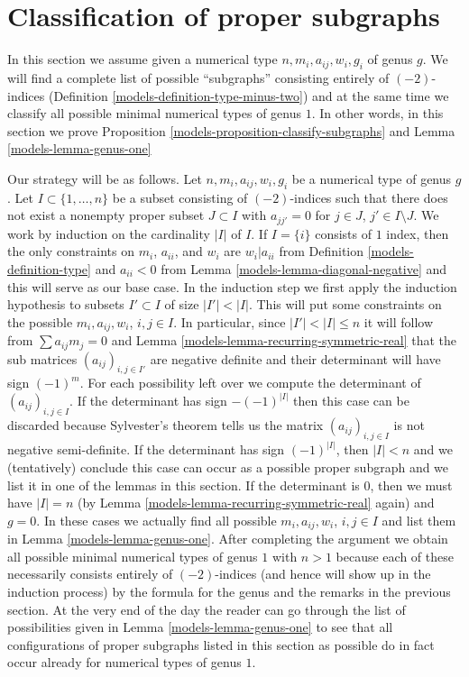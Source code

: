 \section{Classification of proper subgraphs}
\label{models-section-classify-proper-subgraphs}
In this section we assume given a numerical type
$n, m_i, a_{ij}, w_i, g_i$ of genus $g$. We will find
a complete list of possible ``subgraphs'' consisting entirely
of $(-2)$-indices (Definition \ref{models-definition-type-minus-two}) and
at the same time we classify all possible minimal numerical
types of genus $1$. In other words, in this section we prove
Proposition \ref{models-proposition-classify-subgraphs} and
Lemma \ref{models-lemma-genus-one}

\medskip\noindent
Our strategy will be as follows. Let $n, m_i, a_{ij}, w_i, g_i$
be a numerical type of genus $g$. Let $I \subset \{1, \ldots, n\}$ be a subset
consisting of $(-2)$-indices such that there does not exist a nonempty proper
subset $J \subset I$ with $a_{jj'} = 0$ for $j \in J$, $j' \in I \setminus J$.
We work by induction on the cardinality $|I|$ of $I$. If $I = \{i\}$
consists of $1$ index, then the only constraints on $m_i$, $a_{ii}$,
and $w_i$ are $w_i | a_{ii}$ from Definition \ref{models-definition-type}
and $a_{ii} < 0$ from Lemma \ref{models-lemma-diagonal-negative}
and this will serve as our base case. In the induction step
we first apply the induction hypothesis to subsets $I' \subset I$
of size $|I'| < |I|$. This will put some constraints on the possible
$m_i, a_{ij}, w_i$, $i, j \in I$. In particular, since $|I'| < |I| \leq n$
it will follow from $\sum a_{ij}m_j = 0$ and
Lemma \ref{models-lemma-recurring-symmetric-real} that the
sub matrices $(a_{ij})_{i, j \in I'}$ are negative definite
and their determinant will have sign $(-1)^m$.
For each possibility left over we compute the determinant of
$(a_{ij})_{i, j \in I}$. If the determinant has sign $-(-1)^{|I|}$
then this case can be discarded because Sylvester's theorem tells
us the matrix $(a_{ij})_{i, j \in I}$ is not negative semi-definite.
If the determinant has sign $(-1)^{|I|}$, then $|I| < n$ and we
(tentatively) conclude this case can occur as a possible proper subgraph
and we list it in one of the lemmas in this section.
If the determinant is $0$, then we must have $|I| = n$
(by Lemma \ref{models-lemma-recurring-symmetric-real} again) and $g = 0$.
In these cases we actually find all possible $m_i, a_{ij}, w_i$, $i, j \in I$
and list them in Lemma \ref{models-lemma-genus-one}. After completing the
argument we obtain all possible minimal numerical types of genus
$1$ with $n > 1$ because each of these necessarily consists entirely
of $(-2)$-indices (and hence will show up in the induction process)
by the formula for the genus and the remarks in the previous section.
At the very end of the day the reader can go through the list of
possibilities given in Lemma \ref{models-lemma-genus-one} to see that all
configurations of proper subgraphs listed in this section as possible
do in fact occur already for numerical types of genus $1$.

